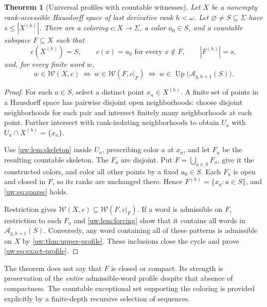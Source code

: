 \documentclass[11pt,letterpaper]{article}
\numberwithin{equation}{section}
\newtheorem{theorem}{Theorem}[section]
\theoremstyle{definition}
\theoremstyle{remark}
\theoremstyle{definition}
\newcommand{\W}{\mathcal W}
\newcommand{\A}{\mathcal A}
\begin{document}
\begin{theorem}[Universal profiles with countable witnesses]\label{uw:thm:profile}
Let $X$ be a nonempty rank-accessible Hausdorff space of last derivative
rank $h<\omega$. Let $\varnothing\ne S\subseteq\Sigma$ have
$s\le|X^{(h)}|$. There are a coloring $c:X\to\Sigma$, a color $a_0\in S$,
and a countable subspace $F\subseteq X$ such that
\begin{equation}\label{uw:eq:sparse}
 c(X^{(h)})=S,
 \qquad c(x)=a_0\text{ for every }x\notin F,
 \qquad |F^{(h)}|=s,
\end{equation}
and, for every finite word $w$,
\begin{equation}\label{uw:eq:exact-profile}
 \boxed{\quad
 w\in\W(X,c)
 \ \Longleftrightarrow\ 
 w\in\W(F,c|_F)
 \ \Longleftrightarrow\ 
 w\in\operatorname{Up}\bigl(\A_{q,h+1}(S)\bigr).
 \quad}
\end{equation}
\end{theorem}
\begin{proof}
For each $a\in S$, select a distinct point $x_a\in X^{(h)}$. A finite set
of points in a Hausdorff space has pairwise disjoint open neighborhoods:
choose disjoint neighborhoods for each pair and intersect finitely many
neighborhoods at each point. Further intersect with rank-isolating
neighborhoods to obtain $U_a$ with
$U_a\cap X^{(h)}=\{x_a\}$.

Use \cref{uw:lem:skeleton} inside $U_a$, prescribing color $a$ at $x_a$, and
let $F_a$ be the resulting countable skeleton. The $F_a$ are disjoint. Put
$F=\bigcup_{a\in S}F_a$, give it the constructed colors, and color all other
points by a fixed $a_0\in S$. Each $F_a$ is open and closed in $F$, so its
ranks are unchanged there. Hence $F^{(h)}=\{x_a:a\in S\}$, and
\eqref{uw:eq:sparse} holds.

Restriction gives $\W(X,c)\subseteq\W(F,c|_F)$. If a word is admissible on
$F$, restriction to each $F_a$ and \cref{uw:lem:forcing} show that it contains
all words in $\A_{q,h+1}(S)$. Conversely, any word containing all of these
patterns is admissible on $X$ by \cref{uw:thm:upper-profile}. These inclusions
close the cycle and prove \eqref{uw:eq:exact-profile}.
\end{proof}

The theorem does not say that $F$ is closed or compact. Its strength is
preservation of the \emph{entire} admissible-word profile despite that absence
of compactness. The countable exceptional set supporting the coloring is
provided explicitly by a finite-depth recursive selection of sequences.
\end{document}
